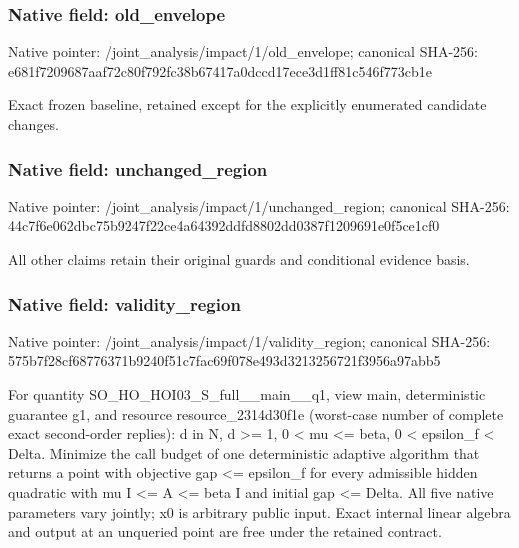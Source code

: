 \documentclass[10pt,a4paper]{article}
\begin{document}
\subsubsection{Native field: old\_\allowbreak{}envelope}
Native pointer: /joint\_\allowbreak{}analysis/impact/1/old\_\allowbreak{}envelope; canonical SHA-256: e681f7209687aaf72c80f792fc38b67417a0dccd17ece3d1ff81c546f773cb1e

\begingroup\raggedright\sloppy Exact frozen baseline,\allowbreak{} retained except for the explicitly enumerated candidate changes.\par\endgroup

\subsubsection{Native field: unchanged\_\allowbreak{}region}
Native pointer: /joint\_\allowbreak{}analysis/impact/1/unchanged\_\allowbreak{}region; canonical SHA-256: 44c7f6e062dbc75b9247f22ce4a64392ddfd8802dd0387f1209691e0f5ce1cf0

\begingroup\raggedright\sloppy All other claims retain their original guards and conditional evidence basis.\par\endgroup

\subsubsection{Native field: validity\_\allowbreak{}region}
Native pointer: /joint\_\allowbreak{}analysis/impact/1/validity\_\allowbreak{}region; canonical SHA-256: 575b7f28cf68776371b9240f51c7fac69f078e493d3213256721f3956a97abb5

\begingroup\raggedright\sloppy For quantity SO\_\allowbreak{}HO\_\allowbreak{}HOI03\_\allowbreak{}S\_\allowbreak{}full\_\allowbreak{}\_\allowbreak{}main\_\allowbreak{}\_\allowbreak{}q1,\allowbreak{} view main,\allowbreak{} deterministic guarantee g1,\allowbreak{} and resource resource\_\allowbreak{}2314d30f1e (worst-case number of complete exact second-order replies):\allowbreak{} d in N,\allowbreak{} d >=\allowbreak{} 1,\allowbreak{} 0 < mu <=\allowbreak{} beta,\allowbreak{} 0 < epsilon\_\allowbreak{}f < Delta. Minimize the call budget of one deterministic adaptive algorithm that returns a point with objective gap <=\allowbreak{} epsilon\_\allowbreak{}f for every admissible hidden quadratic with mu I <=\allowbreak{} A <=\allowbreak{} beta I and initial gap <=\allowbreak{} Delta. All five native parameters vary jointly;\allowbreak{} x0 is arbitrary public input. Exact internal linear algebra and output at an unqueried point are free under the retained contract.\par\endgroup
\end{document}
